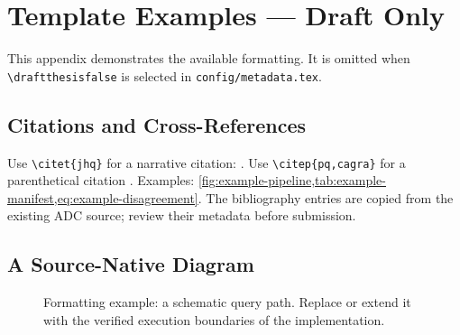 \chapter{Template Examples --- Draft Only}
\label{app:template-examples}
This appendix demonstrates the available formatting. It is omitted when
\verb|\draftthesisfalse| is selected in \texttt{config/metadata.tex}.

\section{Citations and Cross-References}
Use \verb|\citet{jhq}| for a narrative citation: \citet{jhq}.
Use \verb|\citep{pq,cagra}| for a parenthetical citation \citep{pq,cagra}.
Examples: \cref{fig:example-pipeline,tab:example-manifest,eq:example-disagreement}.
The bibliography entries are copied from the existing ADC source; review their
metadata before submission.

\section{A Source-Native Diagram}
\begin{figure}[tbp]
\centering
{}
\caption{Formatting example: a schematic query path. Replace or extend it
with the verified execution boundaries of the implementation.}
\label{fig:example-pipeline}
\end{figure}



